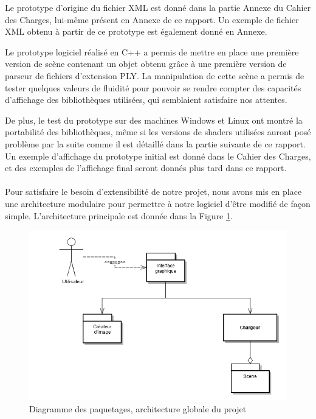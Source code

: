         Le prototype d'origine du fichier XML est donné dans la partie Annexe du Cahier des Charges, lui-même présent en Annexe de ce rapport. Un exemple de fichier XML obtenu à partir de ce prototype est également donné en Annexe.

        Le prototype logiciel réalisé en C++ a permis de mettre en place une première version de scène contenant un objet obtenu grâce à une première version de parseur de fichiers d'extension PLY. La manipulation de cette scène a permis de tester quelques valeurs de fluidité pour pouvoir se rendre compter des capacités d'affichage des bibliothèques utilisées, qui semblaient satisfaire nos attentes. 
        
        De plus, le test du prototype sur des machines Windows et Linux ont montré la portabilité des bibliothèques, même si les versions de shaders utilisées auront posé problème par la suite comme il est détaillé dans la partie suivante de ce rapport. Un exemple d'affichage du prototype initial est donné dans le Cahier des Charges, et des exemples de l'affichage final seront donnés plus tard dans ce rapport.
\paragraph{}
        Pour satisfaire le besoin d'extensibilité de notre projet, nous avons mis en place une architecture modulaire pour permettre à notre logiciel d'être modifié de façon simple. L'architecture principale est donnée dans la Figure \ref{fig:archi_cdc}.

\begin{figure}[h]
	\centering      
	\includegraphics[scale=0.6]{old_pack.png}
	\caption{\label{fig:archi_cdc} Diagramme des paquetages, architecture globale du projet \protect \footnotemark }
\end{figure}


